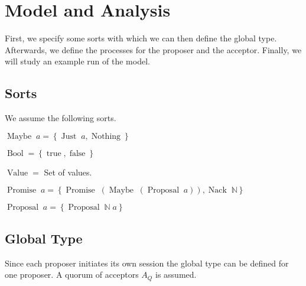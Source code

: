 \chapter{Model and Analysis}
First, we specify some sorts with which we can then define the global type.
Afterwards, we define the processes for the proposer and the acceptor.
Finally, we will study an example run of the model.

\section{Sorts}
\newcommand{\Bool}[0]{\operatorname{Bool}}
\newcommand{\True}[0]{\operatorname{true}}
\newcommand{\False}[0]{\operatorname{false}}
\newcommand{\Maybe}[1]{\operatorname{Maybe}\; #1}
\newcommand{\Just}[1]{\operatorname{Just}\; #1}
\newcommand{\Nothing}[0]{\operatorname{Nothing}}
\newcommand{\Or}[0]{\; | \;}
\newcommand{\Promise}[1]{\operatorname{Promise}\; #1}
\newcommand{\Proposal}[1]{\operatorname{Proposal}\; #1}
\newcommand{\ProposalC}[2]{\operatorname{Proposal}\; #1\; #2}
\newcommand{\Nack}[1]{\operatorname{Nack}\; #1}
\newcommand{\Value}[0]{\operatorname{Value}}

\newcommand{\Curly}[1]{\left\{#1\right\}}
\newcommand{\Paren}[1]{\left(#1\right)}

We assume the following sorts.

$\Maybe{a} = \Curly{\Just{a}, \Nothing}$

$\Bool = \Curly{\True, \False}$

$\Value =$ Set of values.

$\Promise{a} = \Curly{\Promise{\Paren{\Maybe{\Paren{\Proposal{a}}}}}, \Nack{\mathbb{N}}}$

$\Proposal{a} = \Curly{\ProposalC{\mathbb{N}}{a}}$

\section{Global Type}
\newcommand{\DotForall}[1]{\bigodot_{#1}\;}
\newcommand{\SendUnreliableG}[4]{#1 \to_u #2 : #3 \left\langle #4 \right\rangle}
\newcommand{\SendWeaklyG}[3]{#1 \to_w #2 : #3}

\newcommand{\Accept}[0]{\mathnormal{Accept}}
\newcommand{\Restart}[0]{\mathnormal{Restart}}
\newcommand{\Abort}[0]{\mathnormal{Abort}}

\newcommand{\Mu}[1]{\left(\mu #1\right)}

Since each proposer initiates its own session the global type can be defined for one proposer.
A quorum of acceptors $A_Q$ is assumed.

